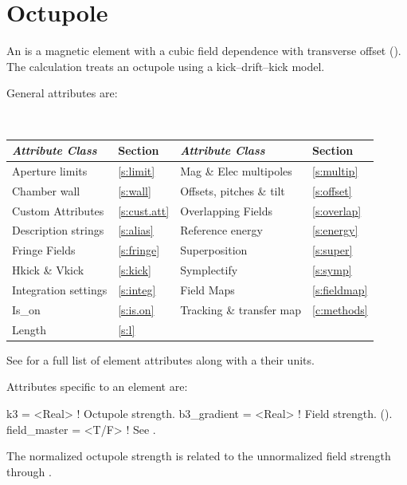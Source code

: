 {\newpage

\section{Octupole}
\label{s:oct}

An  is a magnetic element with a cubic field dependence
with transverse offset ().  The 
calculation treats an octupole using a kick--drift--kick model.

General  attributes are:
\begin{center}
\tt
\begin{tabular}{llll} \toprule
  {\sl Attribute Class}      & Section             & {\sl Attribute Class}      & Section            \\ \midrule
  Aperture limits            & \ref{s:limit}       & Mag \& Elec multipoles     & \ref{s:multip}     \\
  Chamber wall               & \ref{s:wall}        & Offsets, pitches \& tilt   & \ref{s:offset}     \\
  Custom Attributes          & \ref{s:cust.att}    & Overlapping Fields         & \ref{s:overlap}    \\
  Description strings        & \ref{s:alias}       & Reference energy           & \ref{s:energy}     \\ 
  Fringe Fields              & \ref{s:fringe}      & Superposition              & \ref{s:super}      \\
  Hkick \& Vkick             & \ref{s:kick}        & Symplectify                & \ref{s:symp}       \\
  Integration settings       & \ref{s:integ}       & Field Maps                 & \ref{s:fieldmap}   \\
  Is_on                      & \ref{s:is.on}       & Tracking \& transfer map   & \ref{c:methods}    \\ 
  Length                     & \ref{s:l}           &                            &                    \\
  \bottomrule
\end{tabular}
\end{center}
\toffset
See  for a full list of element attributes along with a their units.

Attributes specific to an  element are:
\begin{example}
  k3           = <Real>   ! Octupole strength.
  b3_gradient  = <Real>   ! Field strength. ().
  field_master = <T/F>    ! See .
\end{example}
The normalized octupole  strength is related to the unnormalized  field
strength through .

}
